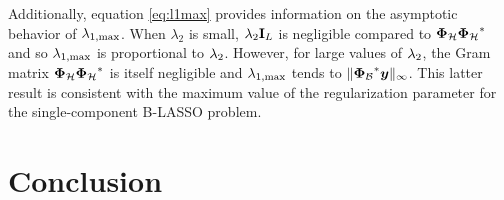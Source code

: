 \documentclass[12pt]{article}
\begin{document}

    Additionally, equation \eqref{eq:l1max} provides information on the asymptotic behavior of $\lambda_{1, \mathrm{max}}$. When $\lambda_2$ is small, $\lambda_{2} \mathbf{I}_L$ is negligible compared to ${\bm{\Phi}_\mathcal{H}} {\bm{\Phi}_\mathcal{H}}^*$ and so $\lambda_{1, \mathrm{max}}$ is proportional to $\lambda_{2}$. However, for large values of $\lambda_{2}$, the Gram matrix ${\bm{\Phi}_\mathcal{H}} {\bm{\Phi}_\mathcal{H}}^*$ is itself negligible and $\lambda_{1, \mathrm{max}}$ tends to $\lVert {\bm{\Phi}_\mathcal{B}}^* \bm{y}\rVert_\infty$. This latter result is consistent with the maximum value of the regularization parameter for the single-component B-LASSO problem.






\section{Conclusion}

\end{document}
